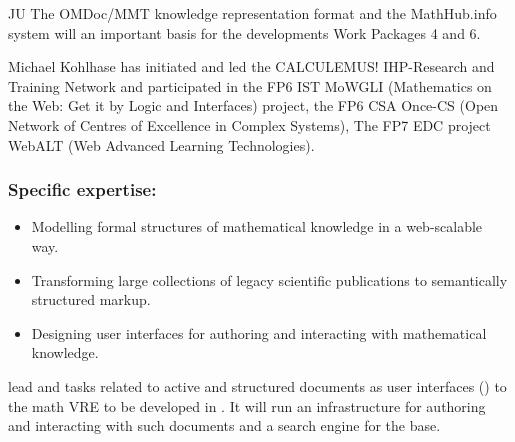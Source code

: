 \begin{sitedescription}{JU}
The \textsf{OMDoc/MMT} knowledge representation format and the \textsf{MathHub.info}
system will an important basis for the developments Work Packages 4 and 6.

Michael Kohlhase has initiated and led the CALCULEMUS! IHP-Research and Training Network
and participated in the FP6 IST MoWGLI (Mathematics on the Web: Get it by Logic and
Interfaces) project, the FP6 CSA Once-CS (Open Network of Centres of Excellence in Complex
Systems), The FP7 EDC project WebALT (Web Advanced Learning Technologies).

\subsubsection*{Specific expertise:}
\begin{itemize}
\item Modelling formal structures of mathematical knowledge in a web-scalable way.
\item Transforming large collections of legacy scientific publications to semantically
  structured markup.
\item Designing user interfaces for authoring and interacting with mathematical knowledge.
\end{itemize}

 lead  and tasks related to active and structured documents as
user interfaces () to the math VRE to be developed in \TheProject. It will run
an infrastructure for authoring and interacting with such documents and a search engine for
the \DKS base. 
\end{sitedescription}


